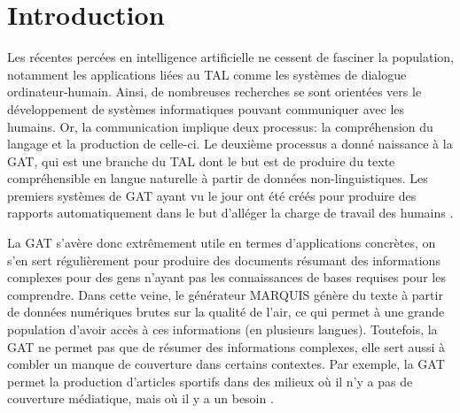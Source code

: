 
\chapter*{Introduction}



Les récentes percées en intelligence artificielle ne cessent de fasciner la population, notamment les applications liées au \acf{TAL} comme les systèmes de dialogue ordinateur-humain. Ainsi, de nombreuses recherches se sont orientées vers le développement de systèmes informatiques pouvant communiquer avec les humains. Or, la communication implique deux processus: la compréhension du langage et la production de celle-ci. Le deuxième processus a donné naissance à la \acf{GAT}, qui est une branche du \ac{TAL} dont le but est de produire du texte compréhensible en langue naturelle à partir de données non-linguistiques. Les premiers systèmes de \ac{GAT} ayant vu le jour ont été créés pour produire des rapports automatiquement dans le but d'alléger la charge de travail des humains \citep{ReiterBuildingNaturalLanguage2000}.

La \ac{GAT} s'avère donc extrêmement utile en termes d'applications concrètes, on s'en sert régulièrement pour produire des documents résumant des informations complexes pour des gens n'ayant pas les connaissances de bases requises pour les comprendre. Dans cette veine, le générateur MARQUIS \citep{WannerMARQUISGENERATIONUSERTAILORED2010} génère du texte à partir de données numériques brutes sur la qualité de l'air, ce qui permet à une grande population d'avoir accès à ces informations (en plusieurs langues). Toutefois, la \ac{GAT} ne permet pas que de résumer des informations complexes, elle sert aussi à combler un manque de couverture dans certains contextes. Par exemple, la \ac{GAT} permet la production d'articles sportifs dans des milieux où il n'y a pas de couverture médiatique, mais où il y a un besoin \citep{lareau11a, W17-3513}.

